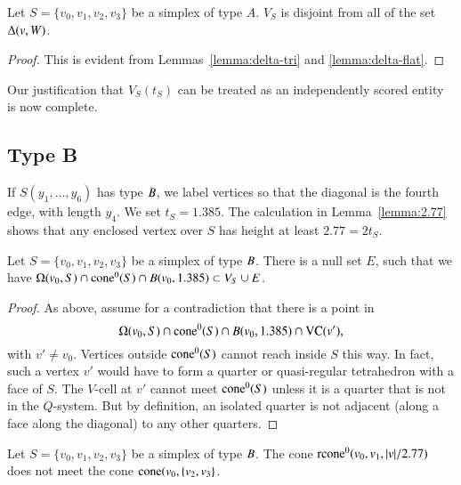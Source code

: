 \begin{lemma} Let $S=\{v_0,v_1,v_2,v_3\}$ be a simplex of type $A$.
  $V_S$ is disjoint from all of the set $\Delta(v,W)$.
\end{lemma}

\begin{proof}
This is evident from
Lemmas~\ref{lemma:delta-tri} and \ref{lemma:delta-flat}.
\end{proof}


Our justification that $V_S(t_S)$ can be treated as an
independently scored entity is now complete.

\subsection{Type B}%

If $S(y_1,\ldots,y_6)$ has type $B$, we label vertices so that
the diagonal is the fourth edge, with length $y_4$. We set
$t_S=1.385$. The calculation in Lemma~\ref{lemma:2.77}
shows that any enclosed vertex over $S$ has height at least
$2.77=2t_S$.

\begin{lemma} Let $S=\{v_0,v_1,v_2,v_3\}$ be a simplex of type $B$.
There is a null set $E$, such that
we have  $ \Omega(v_0,S) \cap {\operatorname{cone}}^0(S) \cap B(v_0,1.385) 
\subset V_S \cup E$.
\end{lemma}

\begin{proof}  As above, assume for a contradiction that there
is a point in 
 $$\Omega(v_0,S)\cap {\operatorname{cone}}^0(S) \cap B(v_0,1.385)\cap {\operatorname{VC}}(v'),$$
with $v'\ne v_0$.
Vertices outside ${\operatorname{cone}}^0(S)$ cannot reach inside $S$ this way.  In
fact, such a vertex $v'$ would have to form a quarter or
quasi-regular tetrahedron with a face of $S$.  The $V$-cell at
$v'$ cannot meet ${\operatorname{cone}}^0(S)$ unless it is a quarter that is not in the
$Q$-system. But by definition, an isolated quarter is not adjacent
(along a face along the diagonal) to any other quarters.
\end{proof}


\begin{lemma} Let $S=\{v_0,v_1,v_2,v_3\}$ be a simplex of type $B$.
The cone ${\operatorname{rcone}}^0(v_0,v_1,|v|/2.77)$ does not meet the
cone ${\operatorname{cone}}(v_0,\{v_2,v_3\}$.
\end{lemma}

